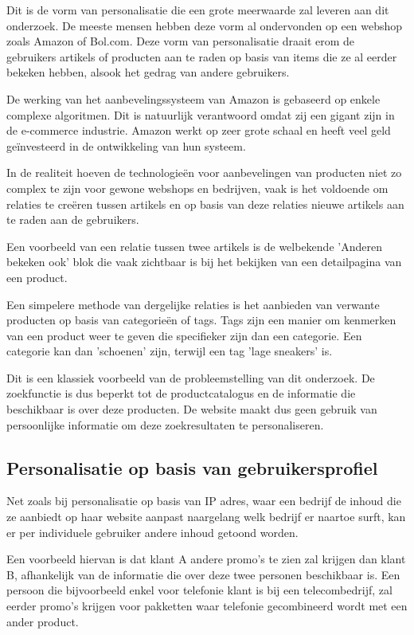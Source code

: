  Dit is de vorm van personalisatie die een grote meerwaarde zal leveren aan dit onderzoek. De meeste mensen hebben deze vorm al ondervonden op een webshop zoals Amazon of Bol.com. Deze vorm van personalisatie draait erom de gebruikers artikels of producten aan te raden op basis van items die ze al eerder bekeken hebben, alsook het gedrag van andere gebruikers.
 
De werking van het aanbevelingssysteem van Amazon is gebaseerd op enkele complexe algoritmen. \autocite{Linden2003} Dit is natuurlijk verantwoord omdat zij een gigant zijn in de e-commerce industrie. Amazon werkt op zeer grote schaal en heeft veel geld geïnvesteerd in de ontwikkeling van hun systeem. 

\newpage
In de realiteit hoeven de technologieën voor aanbevelingen van producten niet zo complex te zijn voor gewone webshops en bedrijven, vaak is het voldoende om relaties te creëren tussen artikels en op basis van deze relaties nieuwe artikels aan te raden aan de gebruikers. 

Een voorbeeld van een relatie tussen twee artikels is de welbekende 'Anderen bekeken ook' blok die vaak zichtbaar is bij het bekijken van een detailpagina van een product. 

Een simpelere methode van dergelijke relaties is het aanbieden van verwante producten op basis van categorieën of tags. Tags zijn een manier om kenmerken van een product weer te geven die specifieker zijn dan een categorie. Een categorie kan dan 'schoenen' zijn, terwijl een tag 'lage sneakers' is. 

Dit is een klassiek voorbeeld van de probleemstelling van dit onderzoek. De zoekfunctie is dus beperkt tot de productcatalogus en de informatie die beschikbaar is over deze producten. De website maakt dus geen gebruik van persoonlijke informatie om deze zoekresultaten te personaliseren.

 \subsection{Personalisatie op basis van gebruikersprofiel}
\label{subsec:Personalisatie op basis van gebruikersprofiel}

Net zoals bij personalisatie op basis van IP adres, waar een bedrijf de inhoud die ze aanbiedt op haar website aanpast naargelang welk bedrijf er naartoe surft, kan er per individuele gebruiker andere inhoud getoond worden. 

Een voorbeeld hiervan is dat klant A andere promo's te zien zal krijgen dan klant B, afhankelijk van de informatie die over deze twee personen beschikbaar is. Een persoon die bijvoorbeeld enkel voor telefonie klant is bij een telecombedrijf, zal eerder promo's krijgen voor pakketten waar telefonie gecombineerd wordt met een ander product.

